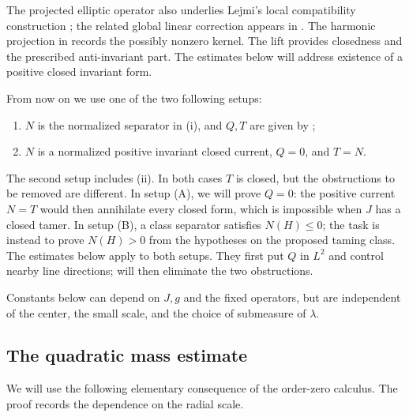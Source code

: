 The projected elliptic operator also underlies Lejmi's local
compatibility construction \cite[Theorem~2.1]{Lejmi2006}; the related
global linear correction appears in
\cite[Proposition~3.1]{DraghiciZhang2012}. The harmonic projection in
 records the possibly nonzero kernel.
The lift provides closedness and the prescribed anti-invariant part.
The estimates below will address existence of a positive closed
invariant form.

From now on we use one of the two following setups:
\begin{enumerate}[label=\textup{(\Alph*)}]
\item $N$ is the normalized separator in
 \textup{(i)}, and $Q,T$ are given by
 ;
\item $N$ is a normalized positive invariant closed current, $Q=0$, and
 $T=N$.
\end{enumerate}
The second setup includes \textup{(ii)}.
In both cases $T$ is closed, but the obstructions to be removed are
different. In setup \textup{(A)}, we will prove $Q=0$: the positive
current $N=T$ would then annihilate every closed form, which is
impossible when $J$ has a closed tamer. In setup \textup{(B)}, a class separator
satisfies $N(H)\le0$; the task is instead to prove $N(H)>0$ from the
hypotheses on the proposed taming class. The estimates below apply to
both setups. They first put $Q$ in $L^2$ and control nearby line
directions;  will then eliminate the two
obstructions.

Constants below can depend on $J,g$ and
the fixed operators, but are independent of the center, the small scale,
and the choice of submeasure of $\lambda$.

\subsection{The quadratic mass estimate}

We will use the following elementary consequence of the order-zero
calculus.  The proof records the dependence on the radial scale.

